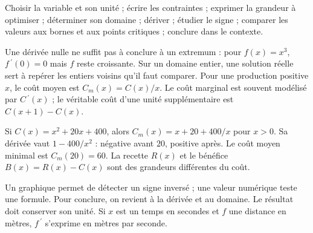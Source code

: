 \begin{savoirfaire}
Choisir la variable et son unité ; écrire les contraintes ; exprimer la grandeur à optimiser ; déterminer son domaine ; dériver ; étudier le signe ; comparer les valeurs aux bornes et aux points critiques ; conclure dans le contexte.
\end{savoirfaire}
Une dérivée nulle ne suffit pas à conclure à un extremum : pour $f(x)=x^3$, $f\,\!^{\prime}(0)=0$ mais $f$ reste croissante.
Sur un domaine entier, une solution réelle sert à repérer les entiers voisins qu'il faut comparer.
Pour une production positive $x$, le coût moyen est $C_m(x)=C(x)/x$.
Le coût marginal est souvent modélisé par $C\,\!^{\prime}(x)$ ; le véritable coût d'une unité supplémentaire est $C(x+1)-C(x)$.
\begin{exemple}
Si $C(x)=x^2+20x+400$, alors $C_m(x)=x+20+400/x$ pour $x>0$.
Sa dérivée vaut $1-400/x^2$ : négative avant $20$, positive après. Le coût moyen minimal est $C_m(20)=60$.
La recette $R(x)$ et le bénéfice $B(x)=R(x)-C(x)$ sont des grandeurs différentes du coût.
\end{exemple}
Un graphique permet de détecter un signe inversé ; une valeur numérique teste une formule. Pour conclure, on revient à la dérivée et au domaine.
Le résultat doit conserver son unité. Si $x$ est un temps en secondes et $f$ une distance en mètres, $f\,\!^{\prime}$ s'exprime en mètres par seconde.

